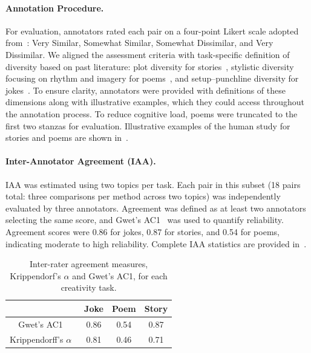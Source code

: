 \paragraph{Annotation Procedure.}
For evaluation, annotators rated each pair on a four-point Likert scale adopted from~\citep{chen-etal-2022-semeval}: Very Similar, Somewhat Similar, Somewhat Dissimilar, and Very Dissimilar. We aligned the assessment criteria with task-specific definition of diversity based on past literature: plot diversity for stories~\citep{Xu_2025}, stylistic diversity focusing on rhythm and imagery for poems~\citep{chen-etal-2024-evaluating-diversity}, and setup–punchline diversity for jokes~\citep{kim2025aihumorgenerationcognitive}. To ensure clarity, annotators were provided with definitions of these dimensions along with illustrative examples, which they could access throughout the annotation process. To reduce cognitive load, poems were truncated to the first two stanzas for evaluation.
Illustrative examples of the human study for stories and poems are shown in~.

\paragraph{Inter-Annotator Agreement (IAA).} 
IAA was estimated using two topics per task. Each pair in this subset (18 pairs total: three comparisons per method across two topics) was independently evaluated by three annotators. Agreement was defined as at least two annotators selecting the same score, and Gwet's AC1~\citep{gwet2008computing} was used to quantify reliability. Agreement scores were 0.86 for jokes, 0.87 for stories, and 0.54 for poems, indicating moderate to high reliability. Complete IAA statistics are provided in~.

\begin{table}[h]
    \centering
    \caption{Inter-rater agreement measures, Krippendorf's $\alpha$ and Gwet’s AC1, for each creativity task.}
    \label{tab:human_study_IAA}
    \begin{tabular}{cccc}
        \toprule
         & Joke & Poem & Story \\
        \midrule
        Gwet's AC1~\citep{gwet2008computing} & 0.86 & 0.54 & 0.87 \\
        \midrule
        Krippendorff's $\alpha$~\citep{krippendorff2018content}  & 0.81 & 0.46 & 0.71 \\
        \bottomrule
    \end{tabular}
\end{table}


